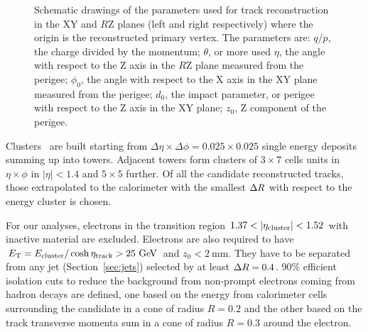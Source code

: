 \begin{figure}[tb]\begin{center}
	\caption[bla]{Schematic drawings of the parameters used for track reconstruction in the XY and $R$Z planes (left and right respectively)
          where the origin is the reconstructed primary vertex\footnotemark.
          The parameters are: $q/p$, the charge divided by the momentum; $\theta$, or more used $\eta$, the angle
          with respect to the Z axis in the $R$Z plane measured from the perigee; $\phi_0$, the angle 
          with respect to the X axis in the XY plane measured from the perigee; $d_0$, the impact parameter, 
          or perigee with respect to the Z axis in the XY plane; $z_0$, Z component of the perigee.\label{fig:trackpar}}
\end{center}\end{figure}

Clusters~\cite{topocluster} are built starting from
$\Delta\eta\times\Delta\phi=0.025\times0.025$ single energy deposits summing
up into towers. Adjacent towers form clusters of $3\times7$ cells units in $\eta\times\phi$
in $|\eta|<1.4$ and $5\times5$ further. Of all the candidate reconstructed tracks,
those extrapolated to the calorimeter with the smallest $\dr$ with respect to the
energy cluster is chosen.

For our analyses, electrons in the transition region $1.37<|\eta_{\rm cluster}| <1.52$
with inactive material are excluded. Electrons are also required to have 
$\et = E_{\rm cluster}/\cosh\eta_{\rm track} > 25\gev$ and $z_0<2~$mm.
They have to be separated from any jet (Section~\ref{sec:jets}) selected by at least $\dr =0.4$.
90\% efficient isolation cuts to reduce the background from non-prompt electrons coming from
hadron decays are defined, one based on the energy from calorimeter cells surrounding the candidate in
a cone of radius $R=0.2$ and the other based on the track transverse momenta sum in a cone of radius $R=0.3$ around
the electron.

